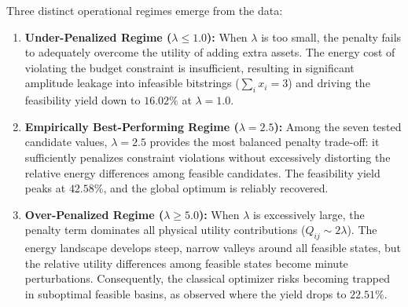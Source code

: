 Three distinct operational regimes emerge from the data:
\begin{enumerate}
    \item \textbf{Under-Penalized Regime ($\lambda \le 1.0$):}
    When $\lambda$ is too small, the penalty fails to adequately overcome the utility of adding extra assets. The energy cost of violating the budget constraint is insufficient, resulting in significant amplitude leakage into infeasible bitstrings ($\sum_i x_i = 3$) and driving the feasibility yield down to $16.02\%$ at $\lambda = 1.0$.
    
    \item \textbf{Empirically Best-Performing Regime ($\lambda = 2.5$):}
    Among the seven tested candidate values, $\lambda = 2.5$ provides the most balanced penalty trade-off: it sufficiently penalizes constraint violations without excessively distorting the relative energy differences among feasible candidates. The feasibility yield peaks at $42.58\%$, and the global optimum is reliably recovered.
    
    \item \textbf{Over-Penalized Regime ($\lambda \ge 5.0$):}
    When $\lambda$ is excessively large, the penalty term dominates all physical utility contributions ($Q_{ij} \sim 2\lambda$). The energy landscape develops steep, narrow valleys around all feasible states, but the relative utility differences among feasible states become minute perturbations. Consequently, the classical optimizer risks becoming trapped in suboptimal feasible basins, as observed where the yield drops to $22.51\%$.
\end{enumerate}
